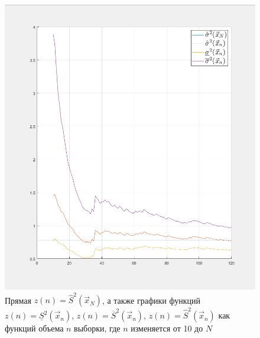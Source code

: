 \documentclass[12pt]{report}
\begin{document}
\begin{figure}[h!]
	\centering
	\includegraphics[width=\textwidth]{img/f2}
	\caption{Прямая $z(n) = \hat S^2(\vec x_N)$, а также графики функций $z(n) = \underline S^2(\vec x_n)$, $z(n) = \overline S^2(\vec x_n)$, $z(n) = \hat S^2(\vec x_n)$ как функций объема $n$ выборки, где $n$ изменяется от 10 до $N$}
\end{figure}

	
\end{document}

